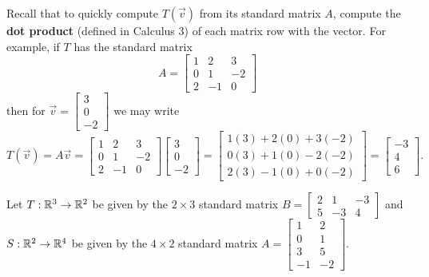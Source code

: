 \begin{applicationActivities}

\begin{observation}
Recall that
  to quickly compute \(T(\vec v)\) from its standard matrix \(A\),
  compute the \textbf{dot product} (defined in Calculus 3) of each matrix row
  with the vector. For example, if \(T\) has the standard matrix
  \[
    A = \begin{bmatrix} 1 & 2 & 3 \\ 0 & 1 & -2 \\ 2 & -1 & 0 \end{bmatrix}
  \]
  then for \(\vec v=\begin{bmatrix}3\\0\\-2\end{bmatrix}\) we may write
  \[
    T(\vec v)
      =
    A\vec v
      =
    \begin{bmatrix} 1 & 2 & 3 \\ 0 & 1 & -2 \\ 2 & -1 & 0 \end{bmatrix}
    \begin{bmatrix}3\\0\\-2\end{bmatrix}
      =
    \begin{bmatrix}
      1(3)+2(0)+3(-2)\\
      0(3)+1(0)-2(-2)\\
      2(3)-1(0)+0(-2)
    \end{bmatrix}
      =
    \begin{bmatrix}
      -3\\
      4\\
      6
    \end{bmatrix}
  .\]
\end{observation}

\begin{activity}{5}
Let $T: \mathbb{R}^3 \rightarrow \mathbb{R}^2$ be given by the \(2\times 3\) standard matrix $B=\begin{bmatrix} 2 & 1 & -3 \\ 5 & -3 & 4 \end{bmatrix}$ and $S: \mathbb{R}^2 \rightarrow \mathbb{R}^4$ be given by the \(4\times 2\) standard matrix $A=\begin{bmatrix} 1 & 2 \\ 0 & 1 \\ 3 & 5 \\ -1 & -2 \end{bmatrix}$.


\end{activity}
\end{applicationActivities}
